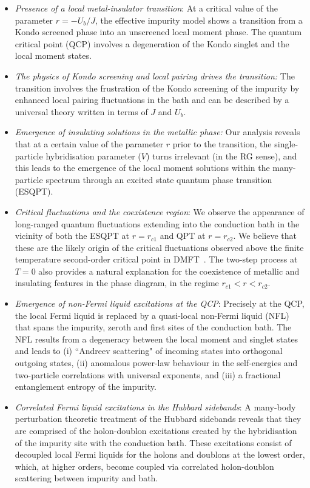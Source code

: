 \begin{itemize}
\item {\it Presence of a local metal-insulator transition}: At a critical value of the parameter $r=-U_{b}/J$, the effective impurity model shows a transition from a Kondo screened phase into an unscreened local moment phase. The quantum critical point (QCP) involves a degeneration of the Kondo singlet and the local moment states.
\item {\it The physics of Kondo screening and local pairing drives the transition:}
The transition involves the frustration of the Kondo screening of the impurity by enhanced local pairing fluctuations in the bath and can be described by a universal theory written in terms of $J$ and $U_b$.
\item {\it Emergence of insulating solutions in the metallic phase:}
Our analysis reveals that at a certain value of the parameter $r$ prior to the transition, the single-particle hybridisation parameter ($V$) turns irrelevant (in the RG sense), and this leads to the emergence of the local moment solutions within the many-particle spectrum through an excited state quantum phase transition (ESQPT).
\item {\it Critical fluctuations and the coexistence region}: 
We observe the appearance of long-ranged quantum fluctuations extending into the conduction bath in the vicinity of both the ESQPT at $r=r_{c1}$ and QPT at $r=r_{c2}$. We believe that these are the likely origin of the critical fluctuations observed above the finite temperature second-order critical point in DMFT~\cite{terletska_mott_2011,vucicevic_2013}. The two-step process at $T=0$ also provides a natural explanation for the coexistence of metallic and insulating features in the phase diagram, in the regime $r_{c1}<r<r_{c2}$.
\item {\it Emergence of non-Fermi liquid excitations at the QCP}:
Precisely at the QCP, the local  Fermi liquid is replaced by a quasi-local non-Fermi liquid (NFL) that spans the impurity, zeroth and first sites of the conduction bath. The NFL results from a degeneracy between the local moment and singlet states and leads to (i) ``Andreev scattering" of incoming states into orthogonal outgoing states, (ii) anomalous power-law behaviour in the self-energies and two-particle correlations with universal exponents, and (iii) a fractional entanglement entropy of the impurity.
\item {\it Correlated Fermi liquid excitations in the Hubbard sidebands}:
A many-body perturbation theoretic treatment of the Hubbard sidebands reveals that they are comprised of the holon-doublon excitations created by the hybridisation of the impurity site with the conduction bath. These excitations consist of decoupled local Fermi liquids for the holons and doublons at the lowest order, which, at higher orders, become coupled via correlated holon-doublon scattering between impurity and bath.
\end{itemize}

